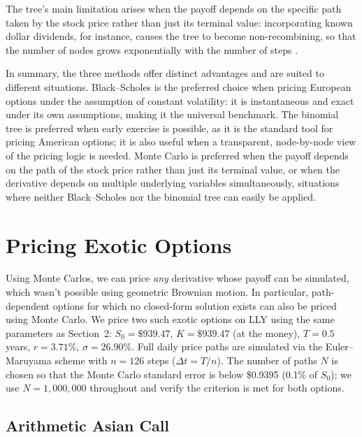 \documentclass[12pt, a4paper]{article}
\begin{document}
The tree's main limitation arises when the payoff depends on the specific path taken by the stock price rather than just its 
terminal value: incorporating known dollar dividends, for 
instance, causes the tree to become non-recombining, so that the 
number of nodes grows exponentially with the number of steps 
\citep[Ch.21]{Hull2022}. 

In summary, the three methods offer distinct advantages and are 
suited to different situations. Black--Scholes is the preferred 
choice when pricing European options under the assumption of 
constant volatility: it is instantaneous and exact under its own 
assumptions, making it the universal benchmark. The binomial tree 
is preferred when early exercise is possible, as it is the 
standard tool for pricing American options; it is also useful 
when a transparent, node-by-node view of the pricing logic is 
needed. Monte Carlo is preferred when the payoff depends on the 
path of the stock price rather than just its terminal value, or 
when the derivative depends on multiple underlying variables 
simultaneously, situations where neither Black--Scholes nor the 
binomial tree can easily be applied.

\section{Pricing Exotic Options}

Using Monte Carlos, we can price \textit{any} derivative whose payoff can be simulated, which wasn't possible using geometric Brownian motion. In particular, path-dependent options for which no closed-form solution exists can also be priced using Monte Carlo. We
price two such exotic options on LLY using the same parameters as Section~2: $S_0 =
\$939.47$, $K = \$939.47$ (at the money), $T = 0.5$ years, $r = 3.71\%$, $\sigma =
26.90\%$. Full daily price paths are simulated via the Euler--Maruyama scheme with
$n = 126$ steps ($\Delta t = T/n$). The number of paths $N$ is chosen so that the
Monte Carlo standard error is below \$0.9395 (0.1\% of $S_0$); we use $N = 1{,}000{,}000$
throughout and verify the criterion is met for both options.

\subsection{Arithmetic Asian Call}
\end{document}

